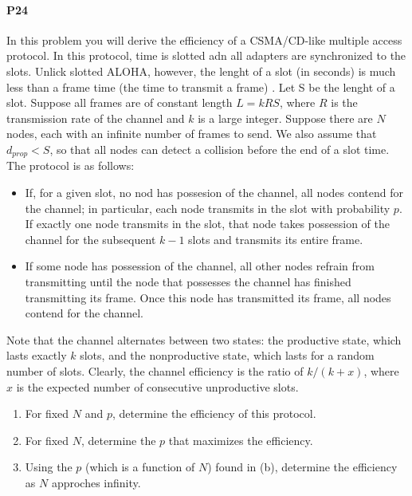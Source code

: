 \documentclass[12pt,letterpaper]{article}
\begin{document}
\paragraph{P24}
In this problem you will derive the efficiency of a CSMA/CD-like multiple
access protocol. In this protocol, time is slotted adn all adapters are 
synchronized to the slots. Unlick slotted ALOHA, however, the lenght of a
slot (in seconds) is much less than a frame time (the time to transmit a frame)
. Let S be the lenght of a slot. Suppose all frames are of constant length 
$L = kRS$, where $R$ is the transmission rate of the channel and $k$ is a
large integer. Suppose there are $N$ nodes, each with an infinite number of
frames to send. We also assume that $d_{prop} < S$, so that all nodes can
detect a collision before the end of a slot time. The protocol is as follows:
\begin{itemize}
\item If, for a given slot, no nod has possesion of the channel, all nodes
    contend for the channel; in particular, each node transmits in the slot
    with probability $p$. If exactly one node transmits in the slot, that node
    takes possession of the channel for the subsequent $k-1$ slots and
    transmits its entire frame.
\item If some node has possession of the channel, all other nodes refrain from
    transmitting until the node that possesses the channel has finished
    transmitting its frame. Once this node has transmitted its frame, all nodes
    contend for the channel.
\end{itemize}
Note that the channel alternates between two states: the productive state, 
which lasts exactly $k$ slots, and the nonproductive state, which lasts for
a random number of slots. Clearly, the channel efficiency is the ratio of
$k/(k+x)$, where $x$ is the expected number of consecutive unproductive slots.
\begin{enumerate}
\item For fixed $N$ and $p$, determine the efficiency of this protocol.
\item For fixed $N$, determine the $p$ that maximizes the efficiency.
\item Using the $p$ (which is a function of $N$) found in (b), determine
    the efficiency as $N$ approches infinity.
\end{enumerate}
\end{document}
